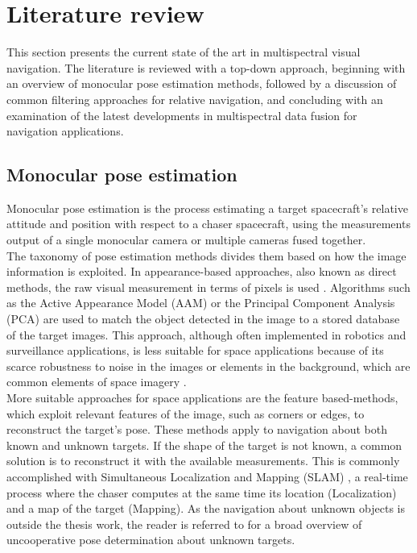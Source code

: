 \section{Literature review}
This section presents the current state of the art in multispectral visual navigation. The literature is reviewed with a top-down approach, beginning with an overview of monocular pose estimation methods, followed by a discussion of common filtering approaches for relative navigation, and concluding with an examination of the latest developments in multispectral data fusion for navigation applications.

\subsection{Monocular pose estimation}
Monocular pose estimation is the process estimating a target spacecraft's relative attitude and position with respect to a chaser spacecraft, using the measurements output of a single monocular camera or multiple cameras fused together. \\
The taxonomy of pose estimation methods divides them based on how the image information is exploited. In appearance-based approaches, also known as direct methods, the raw visual measurement in terms of pixels is used \cite{mohamed2019survey}. Algorithms such as the Active Appearance Model (AAM) or the Principal Component Analysis (PCA) are used to match the object detected in the image to a stored database of the target images. This approach, although often implemented in robotics and surveillance applications, is less suitable for space applications because of its scarce robustness to noise in the images or elements in the background, which are common elements of space imagery \cite{cassinis2019review,opromolla2017review}.\\
More suitable approaches for space applications are the feature based-methods, which exploit relevant features of the image, such as corners or edges, to reconstruct the target's pose. These methods apply to navigation about both known and unknown targets. If the shape of the target is not known, a common solution is to reconstruct it with the available measurements. This is commonly accomplished with Simultaneous Localization and Mapping (SLAM) \cite{durrant2006simultaneous}, a real-time process where the chaser computes at the same time its location (Localization) and a map of the target (Mapping). As the navigation about unknown objects is outside the thesis work, the reader is referred to \cite{opromolla2017review} for a broad overview of uncooperative pose determination about unknown targets.\\
